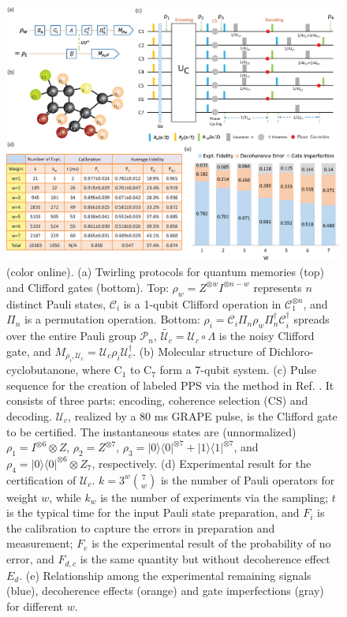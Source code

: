 \documentclass[prl,twocolumn,showpacs]{revtex4-1}
\newcommand{\bra}[1]{\langle #1|}
\newcommand{\ket}[1]{|#1\rangle}
\begin{document}
\begin{figure}[htb]
\begin{center}
\includegraphics[width=2\columnwidth]{everything2.eps}
\end{center}
\setlength{\abovecaptionskip}{-0.35cm}
\caption{\footnotesize{(color online). (a) Twirling protocols for quantum memories (top) and Clifford gates (bottom). Top: $\rho_w = Z^{\otimes w}I^{\otimes n-w}$ represents $n$ distinct Pauli states, $\mathcal{C}_i$ is a 1-qubit Clifford operation in $\mathcal{C}_1^{\otimes n}$, and $\Pi_n$ is a permutation operation. Bottom: $\rho_{i} = \mathcal{C}_i \Pi_n \rho_{w} \Pi_n^{\dagger} \mathcal{C}_i^{\dagger}$ spreads over the entire Pauli group $\mathcal{P}_n$, $\tilde{\mathcal{U}_c} = \mathcal{U}_c \circ \Lambda$ is the noisy Clifford gate, and $M_{\rho_i, \mathcal{U}_c} = \mathcal{U}_c \rho_{i} \mathcal{U}_c^{\dagger}$. (b) Molecular structure of Dichloro-cyclobutanone, where C$_1$ to C$_7$ form a 7-qubit system. (c) Pulse sequence for the creation of labeled PPS via the method in Ref. \cite{Knill2000}. It consists of three parts: encoding, coherence selection (CS) and decoding. $\mathcal{U}_{c}$, realized by a 80 ms GRAPE pulse, is the Clifford gate to be certified. The instantaneous states are (unnormalized) $\rho_1 = I^{\otimes 6}\otimes Z$,  $\rho_2 = Z^{\otimes 7}$, $\rho_3 = \ket{0}\bra{0}^{\otimes 7}+\ket{1}\bra{1}^{\otimes 7}$, and $\rho_4 =  \ket{0}\bra{0}^{\otimes 6} \otimes Z_7$, respectively. (d) Experimental result for the certification of $\mathcal{U}_{c}$. $k=3^w\binom{7}{w}$ is the number of Pauli operators for weight $w$, while $k_w$ is the number of experiments via the sampling; $t$ is the typical time for the input Pauli state preparation, and $F_i$ is the calibration to capture the errors in preparation and measurement; $F_e$ is the experimental result of the probability of no error, and $F_{d,c}$ is the same quantity but without decoherence effect $E_d$. (e) Relationship among the experimental remaining signals (blue), decoherence effects (orange) and gate imperfections (gray) for different $w$.}}\label{everything}
\end{figure}
\end{document}
